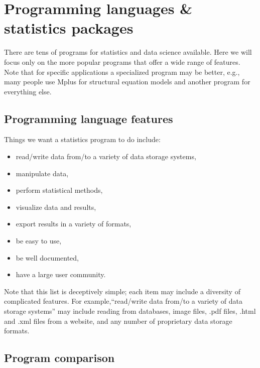 \documentclass[]{book}
\providecommand{\tightlist}{%
  \setlength{\itemsep}{0pt}\setlength{\parskip}{0pt}}
\begin{document}
\section{Programming languages \& statistics
packages}\label{programming-languages-statistics-packages}

There are tens of programs for statistics and data science available.
Here we will focus only on the more popular programs that offer a wide
range of features. Note that for specific applications a specialized
program may be better, e.g., many people use Mplus for structural
equation models and another program for everything else.

\subsection{Programming language
features}\label{programming-language-features}

Things we want a statistics program to do include:

\begin{itemize}
\tightlist
\item
  read/write data from/to a variety of data storage systems,
\item
  manipulate data,
\item
  perform statistical methods,
\item
  visualize data and results,
\item
  export results in a variety of formats,
\item
  be easy to use,
\item
  be well documented,
\item
  have a large user community.
\end{itemize}

Note that this list is deceptively simple; each item may include a
diversity of complicated features. For example,``read/write data from/to
a variety of data storage systems'' may include reading from databases,
image files, .pdf files, .html and .xml files from a website, and any
number of proprietary data storage formats.

\subsection{Program comparison}\label{program-comparison}
\end{document}
